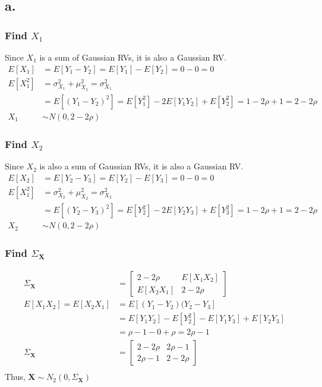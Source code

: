 \documentclass[12pt]{article}
\begin{document}
\subsection{a.}
\subsubsection{Find $X_1$}
Since $X_1$ is a sum of Gaussian RVs, it is also a Gaussian RV.
\begin{align*}
  E[X_1] &= E[Y_1 - Y_2] = E[Y_1] - E[Y_2] = 0 - 0 = 0 \\
  E[X_1^2] &= \sigma_{X_1}^2 + \mu_{X_1}^2 = \sigma_{X_1}^2 \\
  &= E[(Y_1-Y_2)^2] = E[Y_1^2] -2E[Y_1Y_2] + E[Y_2^2] = 1 - 2\rho +1 = 2-2\rho \\
  X_1 &\sim N(0,2-2\rho)
\end{align*}
\subsubsection{Find $X_2$}
Since $X_2$ is also a sum of Gaussian RVs, it is also a Gaussian RV.
\begin{align*}
  E[X_2] &= E[Y_2 - Y_3] = E[Y_2] - E[Y_3] = 0 - 0 = 0 \\
  E[X_1^2] &= \sigma_{X_2}^2 + \mu_{X_2}^2 = \sigma_{X_2}^2 \\
  &= E[(Y_2-Y_3)^2] = E[Y_2^2] -2E[Y_2Y_3] + E[Y_3^2] = 1 - 2\rho +1 = 2-2\rho \\
  X_2 &\sim N(0,2-2\rho)
\end{align*}
\subsubsection{Find $\Sigma_{\bm{X}}$}
\begin{align*}
  \Sigma_{\bm{X}} &= 
  \begin{bmatrix}
    2-2\rho & E[X_1X_2] \\
    E[X_2X_1] & 2-2\rho
  \end{bmatrix} \\
  E[X_1X_2] = E[X_2X_1] &= E[(Y_1-Y_2)(Y_2-Y_3] \\
  &= E[Y_1Y_2] - E[Y_2^2] - E[Y_1Y_3] + E[Y_2Y_3] \\
  &= \rho - 1 - 0 + \rho = 2\rho - 1 \\
  \Sigma_{\bm{X}} &= 
  \begin{bmatrix}
    2-2\rho & 2\rho - 1 \\
    2\rho - 1 & 2-2\rho
  \end{bmatrix} \\
\end{align*}
Thus, $\bm{X} \sim N_2(0,\Sigma_{\bm{X}})$
\end{document}
